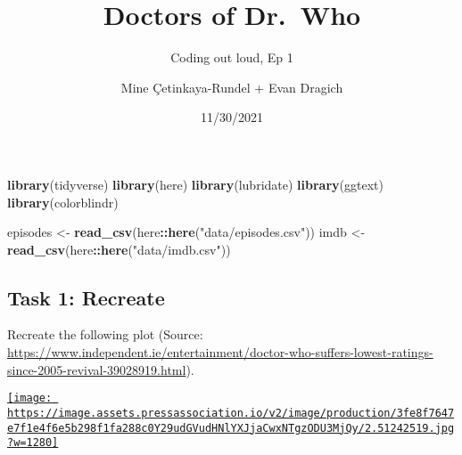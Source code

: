 \documentclass[
]{article}
\title{Doctors of Dr.~Who}
\subtitle{Coding out loud, Ep 1}
\author{Mine Çetinkaya-Rundel + Evan Dragich}
\date{11/30/2021}
\newenvironment{Shaded}{\begin{snugshade}}{\end{snugshade}}
\newcommand{\AttributeTok}[1]{\textcolor[rgb]{0.13,0.29,0.53}{#1}}
\newcommand{\DecValTok}[1]{\textcolor[rgb]{0.00,0.00,0.81}{#1}}
\newcommand{\FloatTok}[1]{\textcolor[rgb]{0.00,0.00,0.81}{#1}}
\newcommand{\FunctionTok}[1]{\textcolor[rgb]{0.13,0.29,0.53}{\textbf{#1}}}
\newcommand{\NormalTok}[1]{#1}
\newcommand{\OtherTok}[1]{\textcolor[rgb]{0.56,0.35,0.01}{#1}}
\newcommand{\SpecialCharTok}[1]{\textcolor[rgb]{0.81,0.36,0.00}{\textbf{#1}}}
\newcommand{\StringTok}[1]{\textcolor[rgb]{0.31,0.60,0.02}{#1}}
\begin{document}
\maketitle

\begin{Shaded}
\begin{Highlighting}[]
\FunctionTok{library}\NormalTok{(tidyverse)}
\FunctionTok{library}\NormalTok{(here)}
\FunctionTok{library}\NormalTok{(lubridate)}
\FunctionTok{library}\NormalTok{(ggtext)}
\FunctionTok{library}\NormalTok{(colorblindr)}
\end{Highlighting}
\end{Shaded}

\begin{Shaded}
\end{Shaded}

\begin{Shaded}
\begin{Highlighting}[]
\NormalTok{episodes }\OtherTok{\textless{}{-}} \FunctionTok{read\_csv}\NormalTok{(here}\SpecialCharTok{::}\FunctionTok{here}\NormalTok{(}\StringTok{"data/episodes.csv"}\NormalTok{))}
\NormalTok{imdb }\OtherTok{\textless{}{-}} \FunctionTok{read\_csv}\NormalTok{(here}\SpecialCharTok{::}\FunctionTok{here}\NormalTok{(}\StringTok{"data/imdb.csv"}\NormalTok{))}
\end{Highlighting}
\end{Shaded}

\hypertarget{task-1-recreate}{%
\subsection{Task 1: Recreate}\label{task-1-recreate}}

Recreate the following plot (Source:
\url{https://www.independent.ie/entertainment/doctor-who-suffers-lowest-ratings-since-2005-revival-39028919.html}).

\href{https://www.independent.ie/entertainment/doctor-who-suffers-lowest-ratings-since-2005-revival-39028919.html}{\texttt{[image: https://image.assets.pressassociation.io/v2/image/production/3fe8f7647e7f1e4f6e5b298f1fa288c0Y29udGVudHNlYXJjaCwxNTgzODU3MjQy/2.51242519.jpg?w=1280]}}
\end{document}
